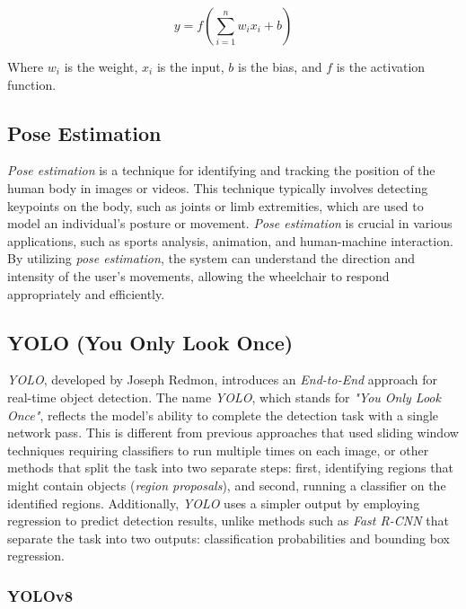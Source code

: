 \begin{equation}
  y = f\left(\sum_{i=1}^{n} w_i x_i + b\right)
\end{equation}

Where \( w_i \) is the weight, \( x_i \) is the input, \( b \) is the bias, and \( f \) is the activation function.

\subsection{Pose Estimation}
\label{subsec:Pose Estimation}

\emph{Pose estimation} is a technique for identifying and tracking the position of the human body in images or videos. This technique typically involves detecting keypoints on the body, such as joints or limb extremities, which are used to model an individual's posture or movement. \emph{Pose estimation} is crucial in various applications, such as sports analysis, animation, and human-machine interaction. By utilizing \emph{pose estimation}, the system can understand the direction and intensity of the user's movements, allowing the wheelchair to respond appropriately and efficiently.

\subsection{YOLO (You Only Look Once)}
\label{subsec:YOLO}

\emph{YOLO}, developed by Joseph Redmon, introduces an \emph{End-to-End} approach for real-time object detection. The name \emph{YOLO}, which stands for \emph{"You Only Look Once"}, reflects the model's ability to complete the detection task with a single network pass. This is different from previous approaches that used sliding window techniques requiring classifiers to run multiple times on each image, or other methods that split the task into two separate steps: first, identifying regions that might contain objects (\emph{region proposals}), and second, running a classifier on the identified regions. Additionally, \emph{YOLO} uses a simpler output by employing regression to predict detection results, unlike methods such as \emph{Fast R-CNN} that separate the task into two outputs: classification probabilities and bounding box regression.

\subsubsection{YOLOv8}
\label{subsubsec:YOLOv8}

